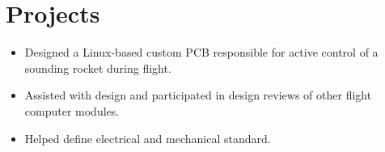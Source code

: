 \documentclass[]{deedy-resume-openfont}
\begin{document}
\begin{minipage}[t]{0.66\textwidth}






\section{Projects}

\begin{itemize}
    \setlength\itemsep{0pt}
    \item Designed a Linux-based custom PCB responsible for active control of a sounding rocket during flight.  
    \item Assisted with design and participated in design reviews of other flight computer modules.     
    \item Helped define electrical and mechanical standard.
\end{itemize}


\end{minipage}
\end{document}
